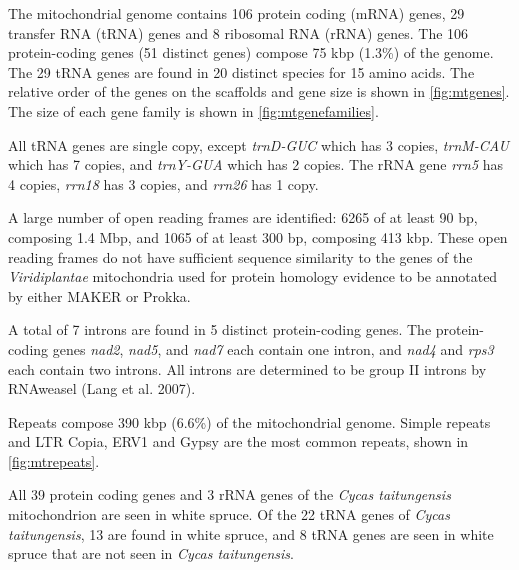 \documentclass[
  12pt,
  oneside,
  openany]{book}
\begin{document}
The mitochondrial genome contains 106 protein coding (mRNA) genes, 29 transfer RNA (tRNA) genes and 8 ribosomal RNA (rRNA) genes. The 106 protein-coding genes (51 distinct genes) compose 75 kbp (1.3\%) of the genome. The 29 tRNA genes are found in 20 distinct species for 15 amino acids. The relative order of the genes on the scaffolds and gene size is shown in \cref{fig:mtgenes}. The size of each gene family is shown in \cref{fig:mtgenefamilies}.

All tRNA genes are single copy, except \emph{trnD-GUC} which has 3 copies, \emph{trnM-CAU} which has 7 copies, and \emph{trnY-GUA} which has 2 copies. The rRNA gene \emph{rrn5} has 4 copies, \emph{rrn18} has 3 copies, and \emph{rrn26} has 1 copy.

A large number of open reading frames are identified: 6265 of at least 90 bp, composing 1.4 Mbp, and 1065 of at least 300 bp, composing 413 kbp. These open reading frames do not have sufficient sequence similarity to the genes of the \emph{Viridiplantae} mitochondria used for protein homology evidence to be annotated by either MAKER or Prokka.

A total of 7 introns are found in 5 distinct protein-coding genes. The protein-coding genes \emph{nad2}, \emph{nad5}, and \emph{nad7} each contain one intron, and \emph{nad4} and \emph{rps3} each contain two introns. All introns are determined to be group II introns by RNAweasel (Lang et al. 2007).

Repeats compose 390 kbp (6.6\%) of the mitochondrial genome. Simple repeats and LTR Copia, ERV1 and Gypsy are the most common repeats, shown in \cref{fig:mtrepeats}.

All 39 protein coding genes and 3 rRNA genes of the \emph{Cycas taitungensis} mitochondrion are seen in white spruce. Of the 22 tRNA genes of \emph{Cycas taitungensis}, 13 are found in white spruce, and 8 tRNA genes are seen in white spruce that are not seen in \emph{Cycas taitungensis}.
\end{document}
